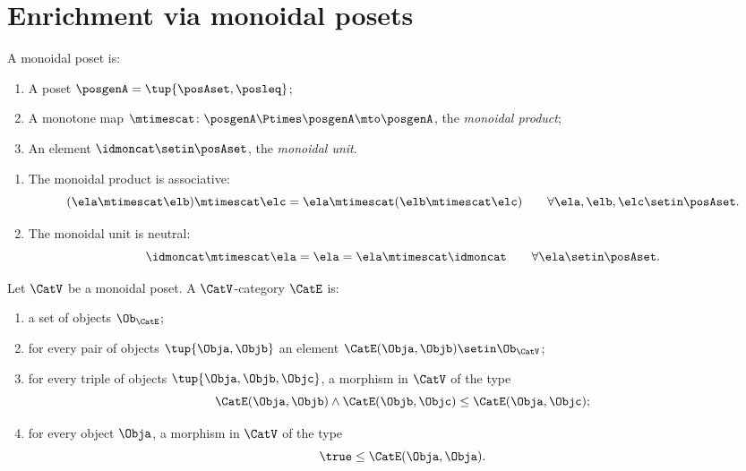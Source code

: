 
\section{Enrichment via monoidal posets}
\label{sec:quantale-enrichment}

\begin{ctdefinition}
A monoidal poset is: 

\constit
\begin{enumerate}
\item A poset $\posgenA = \tup{\posAset, \posleq}$;
\item A monotone map $\mtimescat \colon \posgenA \Ptimes \posgenA \mto \posgenA$, the \emph{monoidal product}; 
\item An element $\idmoncat \setin \posAset$, the \emph{monoidal unit}. 
\end{enumerate}

\condit
\begin{enumerate}
\item The monoidal product is associative: 
\begin{equation}
(\ela \mtimescat \elb) \mtimescat \elc = \ela \mtimescat (\elb \mtimescat \elc) \qquad \forall \ela, \elb, \elc \setin \posAset.
\end{equation}
\item The monoidal unit is neutral:
\begin{equation}
\idmoncat \mtimescat \ela = \ela = \ela \mtimescat \idmoncat \qquad \forall \ela \setin \posAset.
\end{equation}
 
\end{enumerate}


\end{ctdefinition}


\begin{ctdefinition}
Let $\CatV$ be a monoidal poset. A $\CatV$-category $\CatE$ is:

\constit
\begin{enumerate}
\item a set of objects $\Ob_\CatE$; 
\item for every pair of objects $\tup{\Obja, \Objb}$ an element $\CatE(\Obja, \Objb) \setin \Ob_\CatV$; 
\item for every triple of objects $\tup{\Obja, \Objb, \Objc}$, a morphism in $\CatV$ of the type
\begin{equation}
\CatE(\Obja, \Objb) \wedge \CatE(\Objb, \Objc) \leq \CatE(\Obja, \Objc);
\end{equation}
\item for every object $\Obja$, a morphism in $\CatV$ of the type
\begin{equation}
\true \leq \CatE(\Obja, \Obja).
\end{equation}
\end{enumerate}
\end{ctdefinition}

